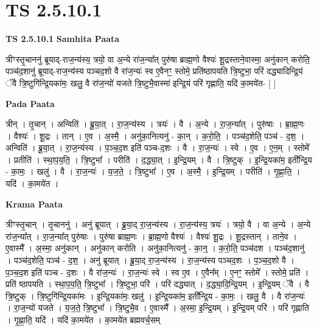 \documentclass[17pt]{extarticle}
\begin{document}
\section{ TS 2.5.10.1 }

\textbf{TS 2.5.10.1 } \newline
\textbf{Samhita Paata} \newline

त्रीꣳस्तृ॒चाननु॑ ब्रूयाद्-राज॒न्य॑स्य॒ त्रयो॒ वा अ॒न्ये रा॑ज॒न्या᳚त् पुरु॑षा ब्राह्म॒णो वैश्यः॑ शू॒द्रस्ताने॒वास्मा॒ अनु॑कान् करोति॒ पञ्च॑द॒शानु॑ ब्रूयाद्-राज॒न्य॑स्य पञ्चद॒शो वै रा॑ज॒न्यः॑ स्व ए॒वैनꣳ॒॒ स्तोमे॒ प्रति॑ष्ठापयति त्रि॒ष्टुभा॒ परि॑ दद्ध्यादिन्द्रि॒यं ॅवै त्रि॒ष्टुगि॑न्द्रि॒यका॑मः॒ खलु॒ वै रा॑ज॒न्यो॑ यजते त्रि॒ष्टुभै॒वास्मा॑ इन्द्रि॒यं परि॑ गृह्णाति॒ यदि॑ का॒मये॑त-  [  ] \newline

\textbf{Pada Paata} \newline

त्रीन् । तृ॒चान् । अन्विति॑ । ब्रू॒या॒त् । रा॒ज॒न्य॑स्य । त्रयः॑ । वै । अ॒न्ये । रा॒ज॒न्या᳚त् । पुरु॑षाः । ब्रा॒ह्म॒णः । वैश्यः॑ । शू॒द्रः । तान् । ए॒व । अ॒स्मै॒ । अनु॑का॒नित्यनु॑ - का॒न् । क॒रो॒ति॒ । पञ्च॑द॒शेति॒ पञ्च॑ - द॒श॒ । अन्विति॑ । ब्रू॒या॒त् । रा॒ज॒न्य॑स्य । प॒ञ्च॒द॒श इति॑ पञ्च-द॒शः । वै । रा॒ज॒न्यः॑ । स्वे । ए॒व । ए॒न॒म् । स्तोमे᳚ । प्रतीति॑ । स्था॒प॒य॒ति॒ । त्रि॒ष्टुभा᳚ । परीति॑ । द॒द्ध्या॒त् । इ॒न्द्रि॒यम् । वै । त्रि॒ष्टुक् । इ॒न्द्रि॒यका॑म॒ इती᳚न्द्रि॒य - का॒मः॒ । खलु॑ । वै । रा॒ज॒न्यः॑ । य॒ज॒ते॒ । त्रि॒ष्टुभा᳚ । ए॒व । अ॒स्मै॒ । इ॒न्द्रि॒यम् । परीति॑ । गृ॒ह्णा॒ति॒ । यदि॑ । का॒मये॑त ।  \newline


\textbf{Krama Paata} \newline

त्रीꣳस्तृ॒चान् । तृ॒चाननु॑ । अनु॑ ब्रूयात् । ब्रू॒या॒द् रा॒ज॒न्य॑स्य । रा॒ज॒न्य॑स्य॒ त्रयः॑ । त्रयो॒ वै । वा अ॒न्ये । अ॒न्ये रा॑ज॒न्या᳚त् । रा॒ज॒न्या᳚त् पुरु॑षाः । पुरु॑षा ब्राह्म॒णः । ब्रा॒ह्म॒णो वैश्यः॑ । वैश्यः॑ शू॒द्रः । शू॒द्रस्तान् । ताने॒व । ए॒वास्मै᳚ । अ॒स्मा॒ अनु॑कान् । अनु॑कान् करोति । अनु॑का॒नित्यनु॑ - का॒न्॒ । क॒रो॒ति॒ पञ्च॑दश । पञ्च॑द॒शानु॑ । पञ्च॑द॒शेति॒ पञ्च॑ - द॒श॒ । अनु॑ ब्रूयात् । ब्रू॒या॒द् रा॒ज॒न्य॑स्य । रा॒ज॒न्य॑स्य पञ्चद॒शः । प॒ञ्च॒द॒शो वै । प॒ञ्च॒द॒श इति॑ पञ्च - द॒शः । वै रा॑ज॒न्यः॑ । रा॒ज॒न्यः॑ स्वे । स्व ए॒व । ए॒वैन᳚म् । ए॒नꣳ॒॒ स्तोमे᳚ । स्तोमे॒ प्रति॑ । प्रति॑ ष्ठापयति । स्था॒प॒य॒ति॒ त्रि॒ष्टुभा᳚ । त्रि॒ष्टुभा॒ परि॑ । परि॑ दद्ध्यात् । द॒द्ध्या॒दि॒न्द्रि॒यम् । इ॒न्द्रि॒यम् ॅवै । वै त्रि॒ष्टुक् । त्रि॒ष्टुगि॑न्द्रि॒यका॑मः । इ॒न्द्रि॒यका॑मः॒ खलु॑ । इ॒न्द्रि॒यका॑म॒ इती᳚न्द्रि॒य - का॒मः॒ । खलु॒ वै । वै रा॑ज॒न्यः॑ । रा॒ज॒न्यो॑ यजते । य॒ज॒ते॒ त्रि॒ष्टुभा᳚ । त्रि॒ष्टुभै॒व । ए॒वास्मै᳚ । अ॒स्मा॒ इ॒न्द्रि॒यम् । इ॒न्द्रि॒यम् परि॑ । परि॑ गृह्णाति । गृ॒ह्णा॒ति॒ यदि॑ । यदि॑ का॒मये॑त । का॒मये॑त ब्रह्मवर्च॒सम् \newline
\end{document}
